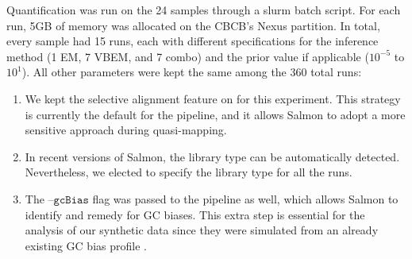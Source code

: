 Quantification was run on the 24 samples through a slurm batch script. 
For each run, 5GB of memory was allocated on the CBCB’s Nexus partition. 
In total, every sample had 15 runs, each with different specifications for the inference method (1 EM, 7 VBEM, and 7 combo) 
and the prior value if applicable ($10^{-5}$ to $10^1$).  All other parameters were kept the same among the 360 total runs: 
\begin{enumerate}
    \item We kept the selective alignment feature on for this experiment. This strategy is currently the default for the pipeline, 
    and it allows Salmon to adopt a more sensitive approach during quasi-mapping.
    \item In recent versions of Salmon, the library type can be automatically detected. Nevertheless, we elected to 
    specify the library type for all the runs.
    \item The $\mathtt{–gcBias}$ flag was passed to the pipeline as well, which allows Salmon to identify and  remedy for 
    GC biases. This extra step is essential for the analysis of our synthetic data since they were simulated from an already 
    existing GC bias profile \cite{love_swimming_2018}.
    
\end{enumerate}
